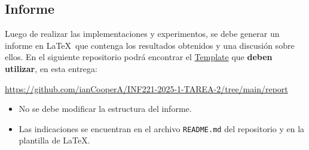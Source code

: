 \subsection{Informe} \label{subsec:report}

Luego de realizar las implementaciones y experimentos, se debe generar un informe en \LaTeX\ que contenga los resultados obtenidos y una discusión sobre ellos. En el siguiente repositorio podrá encontrar el \href{https://github.com/ianCooperA/INF221-2025-1-TAREA-2/tree/main/report}{Template} que \textbf{deben utilizar}, en esta entrega:

\begin{mdframed}

\begin{center}
    
    \url{https://github.com/ianCooperA/INF221-2025-1-TAREA-2/tree/main/report}
        
\end{center}
\end{mdframed}

\begin{itemize}
    \item No se debe modificar la estructura del informe.
    \item Las indicaciones se encuentran en el archivo \texttt{README.md} del repositorio y en la plantilla de \LaTeX. 
\end{itemize}

